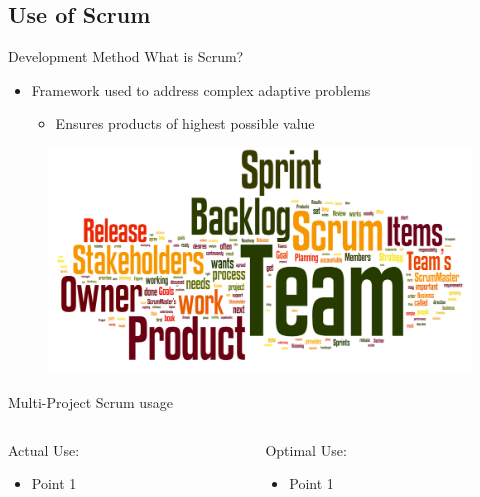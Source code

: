 \subsection{Use of Scrum}
\begin{frame}{Development Method}
  What is Scrum?
  \linespace

  \begin{itemize}
  \item Framework used to address complex adaptive problems
    \begin{itemize}
    \item Ensures products of highest possible value
    \end{itemize}
  \end{itemize}

	\begin{figure}
		\includegraphics[width=1\textwidth]{slides/agile-glossary.png}
	\end{figure}
\end{frame}

\begin{frame}{Multi-Project Scrum usage}
  \begin{columns}
  		\begin{column}{0.5\textwidth}
  			Actual Use:
  			\linespace
  			\begin{itemize}
  				\item Point 1
  			\end{itemize}
  		\end{column}
  		\pause
  		\begin{column}{0.5\textwidth}
  			Optimal Use:
  			\linespace
  			\begin{itemize}
  				\item Point 1
  			\end{itemize}
  		\end{column}
  \end{columns}
\end{frame}

